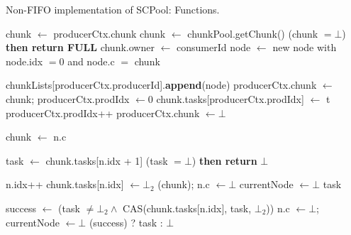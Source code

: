 \begin{algo}[!ht]
\caption{Non-FIFO implementation of SCPool: Functions.} 
\label{alg:non-fifo}
\scriptsize
\begin{minipage}[t]{0.48\textwidth}
\begin{distribalgo}[1]
\setcounter{ALC@line}{\value{alg:non-fifo:lines}}
\smallskip
{}
	\STATE chunk $\leftarrow$ producerCtx.chunk
		\STATE chunk $\leftarrow$ chunkPool.getChunk()
		 (chunk $= \bot$) {\bf then return FULL} 
		\STATE chunk.owner $\leftarrow$ consumerId
		\STATE node $\leftarrow$ new node with node.idx $=0$ and node.c $=$ chunk
		
		\STATE chunkLists[producerCtx.producerId].{\bf append}(node)
		\STATE producerCtx.chunk $\leftarrow$ chunk; producerCtx.prodIdx $\leftarrow 0$ 
	\ENDINDENT
	\STATE chunk.tasks[producerCtx.prodIdx] $\leftarrow$ t
	\STATE producerCtx.prodIdx++
	  \STATE producerCtx.chunk $\leftarrow \bot$ 
	\ENDINDENT
\ENDINDENT

\medskip

  \STATE chunk $\leftarrow$ n.c
 
  \STATE task $\leftarrow$ chunk.tasks[n.idx + 1]
   (task $= \bot$) {\bf then return} $\bot$ 
 	
 	\smallskip 
  \STATE n.idx++ 
 		\STATE chunk.tasks[n.idx] $\leftarrow \bot_2$
  		(chunk); n.c $\leftarrow \bot$
  		\STATE currentNode $\leftarrow \bot$
  	\ENDINDENT
  	 task 
  \ENDINDENT
  
  \smallskip
 	\STATE success $\leftarrow$ (task $\neq \bot_2 \wedge $ CAS(chunk.tasks[n.idx], task, $\bot_2$))
	\STATE n.c $\leftarrow \bot$; currentNode $\leftarrow \bot$
 	 (success) ? task : $\bot$
\ENDINDENT


\end{distribalgo}
\end{minipage}
\end{algo}
